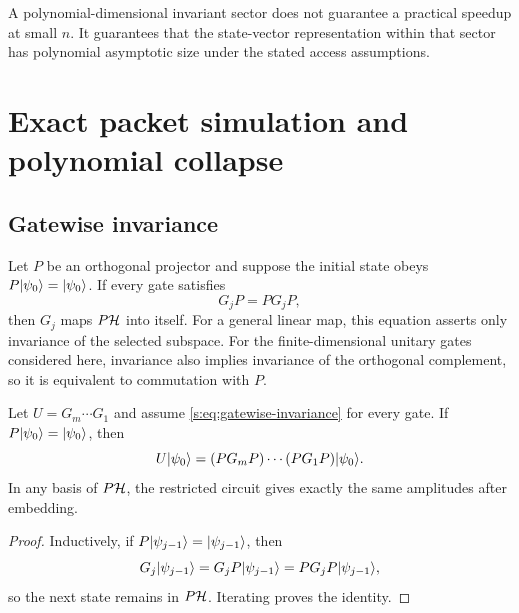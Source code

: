 \begin{scopebox}
A polynomial-dimensional invariant sector does not guarantee a practical speedup at small $n$. It guarantees that the state-vector representation within that sector has polynomial asymptotic size under the stated access assumptions.
\end{scopebox}

\section{Exact packet simulation and polynomial collapse}
\label{s:ch:exact-simulation}

\subsection{Gatewise invariance}
Let $P$ be an orthogonal projector and suppose the initial state obeys $P\lvert \psi_0\rangle=\lvert \psi_0\rangle$. If every gate satisfies
\begin{equation}
G_jP=PG_jP,
\label{s:eq:gatewise-invariance}
\end{equation}
then $G_j$ maps $P\mathcal H$ into itself. For a general linear map, this equation asserts only invariance of the selected subspace. For the finite-dimensional unitary gates considered here, invariance also implies invariance of the orthogonal complement, so it is equivalent to commutation with $P$.

\begin{theorem}
\label{s:thm:invariant-basis}
Let $U=G_m\cdots G_1$ and assume \cref{s:eq:gatewise-invariance} for every gate. If $P\lvert \psi_0\rangle=\lvert \psi_0\rangle$, then
\[
U\lvert \psi_0\rangle
=
(PG_mP)\cdots(PG_1P)\lvert \psi_0\rangle.
\]
In any basis of $P\mathcal H$, the restricted circuit gives exactly the same amplitudes after embedding.
\end{theorem}

\begin{proof}
Inductively, if $P\lvert \psi_{j-1}\rangle=\lvert \psi_{j-1}\rangle$, then
\[
G_j\lvert \psi_{j-1}\rangle
=
G_jP\lvert \psi_{j-1}\rangle
=
PG_jP\lvert \psi_{j-1}\rangle,
\]
so the next state remains in $P\mathcal H$. Iterating proves the identity.
\end{proof}

